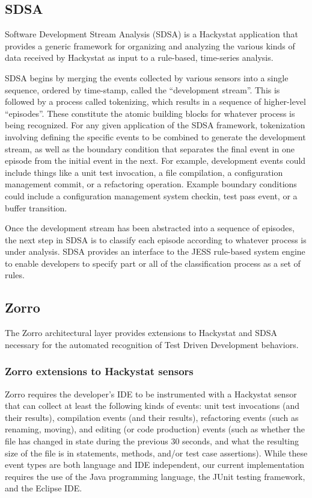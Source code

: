 \documentclass[smallextended]{svjour3}     %
\begin{document}
\subsection{SDSA}

Software Development Stream Analysis (SDSA) is a Hackystat application that
provides a generic framework for organizing and analyzing the various kinds
of data received by Hackystat as input to a rule-based, time-series
analysis.

SDSA begins by merging the events collected by various sensors into a single sequence, 
ordered by time-stamp, called the ``development stream''.  
This is followed by a process called tokenizing, which results in a 
sequence of higher-level ``episodes''.  These 
constitute the atomic building blocks for whatever process is being
recognized.  For any given application of the SDSA framework, tokenization
involving defining the specific events to be combined to generate the
development stream, as well as the boundary condition that separates the
final event in one episode from the initial event in the next. For example, 
development events could include things like a unit test invocation, a file compilation, a
configuration management commit, or a refactoring operation.  Example
boundary conditions could include a configuration management system checkin, test
pass event, or a buffer transition.

Once the development stream has been abstracted into a sequence of
episodes, the next step in SDSA is to classify each episode according to
whatever process is under analysis.  SDSA provides an interface to the JESS
rule-based system engine to enable developers to specify part or all of the
classification process as a set of rules.

\subsection{Zorro}

The Zorro architectural layer provides extensions to Hackystat and SDSA
necessary for the automated recognition of Test Driven Development
behaviors.

\subsubsection{Zorro extensions to Hackystat sensors}

Zorro requires the developer's IDE to be instrumented with a Hackystat
sensor that can collect at least the following kinds of events: unit test
invocations (and their results), compilation events (and their results),
refactoring events (such as renaming, moving), and editing (or code
production) events (such as whether the file has changed in state during
the previous 30 seconds, and what the resulting size of the file is in
statements, methods, and/or test case assertions).  While these event types
are both language and IDE independent, our current implementation requires
the use of the Java programming language, the JUnit testing framework, and
the Eclipse IDE.
\end{document}
